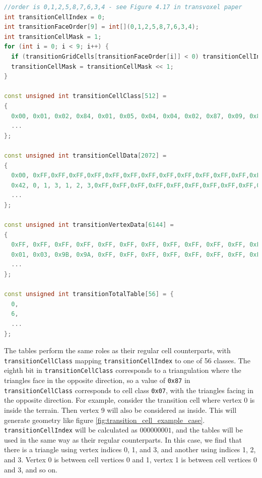 \documentclass[11pt]{article}
\begin{document}
\begin{lstlisting}[language=C++, label={tv_transition_tables}, caption={Calculation of \texttt{transitionCellIndex}, and lookup tables for transition cells. An example of their usage is given below.}]
//order is 0,1,2,5,8,7,6,3,4 - see Figure 4.17 in transvoxel paper
int transitionCellIndex = 0;
int transitionFaceOrder[9] = int[](0,1,2,5,8,7,6,3,4);
int transitionCellMask = 1;
for (int i = 0; i < 9; i++) {
  if (transitionGridCells[transitionFaceOrder[i]] < 0) transitionCellIndex |= transitionCellMask;
  transitionCellMask = transitionCellMask << 1;
}

const unsigned int transitionCellClass[512] =
{
  0x00, 0x01, 0x02, 0x84, 0x01, 0x05, 0x04, 0x04, 0x02, 0x87, 0x09, 0x8C, 0x84, 0x0B, 0x05, 0x05,
  ...
};

const unsigned int transitionCellData[2072] =
{
  0x00, 0xFF,0xFF,0xFF,0xFF,0xFF,0xFF,0xFF,0xFF,0xFF,0xFF,0xFF,0xFF,0xFF,0xFF,0xFF,0xFF,0xFF,0xFF,0xFF,0xFF,0xFF,0xFF,0xFF,0xFF,0xFF,0xFF,0xFF,0xFF,0xFF,0xFF,0xFF,0xFF,0xFF,0xFF,0xFF,0xFF,
  0x42, 0, 1, 3, 1, 2, 3,0xFF,0xFF,0xFF,0xFF,0xFF,0xFF,0xFF,0xFF,0xFF,0xFF,0xFF,0xFF,0xFF,0xFF,0xFF,0xFF,0xFF,0xFF,0xFF,0xFF,0xFF,0xFF,0xFF,0xFF,0xFF,0xFF,0xFF,0xFF,0xFF,0xFF,
  ...
};

const unsigned int transitionVertexData[6144] =
{
  0xFF, 0xFF, 0xFF, 0xFF, 0xFF, 0xFF, 0xFF, 0xFF, 0xFF, 0xFF, 0xFF, 0xFF,
  0x01, 0x03, 0x9B, 0x9A, 0xFF, 0xFF, 0xFF, 0xFF, 0xFF, 0xFF, 0xFF, 0xFF,
  ...
};

const unsigned int transitionTotalTable[56] = {
  0,
  6,
  ...
};       
\end{lstlisting}

The tables perform the same roles as their regular cell counterparts, with \linebreak\texttt{transitionCellClass} mapping \texttt{transitionCellIndex} to one of 56 classes. The eighth bit in \texttt{transitionCellClass} corresponds to a triangulation where the triangles face in the opposite direction, so a value of \texttt{0x87} in \texttt{transitionCellClass} corresponds to cell class \texttt{0x07}, with the triangles facing in the opposite direction. 
For example, consider the transition cell where vertex 0 is inside the terrain. Then vertex 9 will also be considered as inside. This will generate geometry like figure \ref{fig:transition_cell_example_case}. \texttt{transitionCellIndex} will be calculated as $000000001$, and the tables will be used in the same way as their regular counterparts. 
In this case, we find that there is a triangle using vertex indices 0, 1, and 3, and another using indices 1, 2, and 3. Vertex 0 is between cell vertices 0 and 1, vertex 1 is between cell vertices 0 and 3, and so on.
\end{document}
